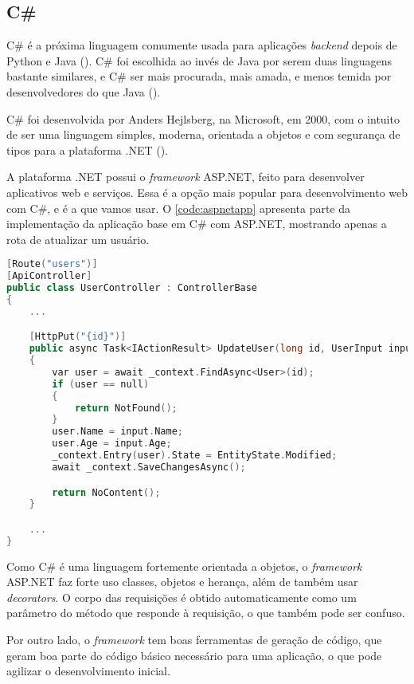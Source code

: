 \subsection{C\#}

C\# é a próxima linguagem comumente usada para aplicações \textit{backend} depois
de Python e Java (\textcite{tiobeindex}). C\# foi escolhida ao invés de Java por
serem duas linguagens bastante similares, e C\# ser mais procurada, mais amada,
e menos temida por desenvolvedores do que Java (\textcite{stackoverflowsurvey}).

C\# foi desenvolvida por Anders Hejlsberg, na Microsoft, em 2000, com o intuito
de ser uma linguagem simples, moderna, orientada a objetos e com segurança de tipos
para a plataforma .NET (\textcite{csharpmanual}).

A plataforma .NET possui o \textit{framework} ASP.NET, feito para desenvolver
aplicativos web e serviços. Essa é a opção mais popular para desenvolvimento web
com C\#, e é a que vamos usar. O \autoref{code:aspnetapp} apresenta parte da implementação
da aplicação base em C\# com ASP.NET, mostrando apenas a rota de atualizar um
usuário.

\begin{lstlisting}[language=C++,label={code:aspnetapp},caption={Aplicação base em C\# com ASP.NET}]
[Route("users")]
[ApiController]
public class UserController : ControllerBase
{
    ...

    [HttpPut("{id}")]
    public async Task<IActionResult> UpdateUser(long id, UserInput input)
    {
        var user = await _context.FindAsync<User>(id);
        if (user == null)
        {
            return NotFound();
        }
        user.Name = input.Name;
        user.Age = input.Age;
        _context.Entry(user).State = EntityState.Modified;
        await _context.SaveChangesAsync();

        return NoContent();
    }

    ...
}
\end{lstlisting}

Como C\# é uma linguagem fortemente orientada a objetos, o \textit{framework} ASP.NET
faz forte uso classes, objetos e herança, além de também usar \textit{decorators}.
O corpo das requisições é obtido automaticamente como um parâmetro do método que
responde à requisição, o que também pode ser confuso.

Por outro lado, o \textit{framework} tem boas ferramentas de geração de código,
que geram boa parte do código básico necessário para uma aplicação, o que pode
agilizar o desenvolvimento inicial.

